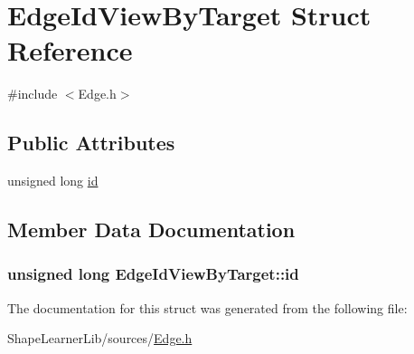 \hypertarget{struct_edge_id_view_by_target}{}\section{Edge\+Id\+View\+By\+Target Struct Reference}
\label{struct_edge_id_view_by_target}


{\ttfamily \#include $<$Edge.\+h$>$}

\subsection*{Public Attributes}
\begin{DoxyCompactItemize}
\item 
unsigned long \hyperlink{struct_edge_id_view_by_target_a280b1cfd3fea7305ef6f7c0416eb7e3a}{id}
\end{DoxyCompactItemize}


\subsection{Member Data Documentation}
\hypertarget{struct_edge_id_view_by_target_a280b1cfd3fea7305ef6f7c0416eb7e3a}{}
\subsubsection[{id}]{\setlength{\rightskip}{0pt plus 5cm}unsigned long Edge\+Id\+View\+By\+Target\+::id}\label{struct_edge_id_view_by_target_a280b1cfd3fea7305ef6f7c0416eb7e3a}


The documentation for this struct was generated from the following file\+:\begin{DoxyCompactItemize}
\item 
Shape\+Learner\+Lib/sources/\hyperlink{_edge_8h}{Edge.\+h}\end{DoxyCompactItemize}
